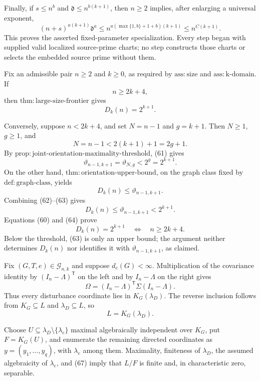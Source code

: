 Finally, if \(s\leq n^b\) and \(\mathfrak d\leq n^{b(k+1)}\), then \(n\geq2\) implies, after enlarging a universal exponent,
\[
 (n+s)^{a(k+1)}\mathfrak d^a
 \leq n^{a(\max\{1,b\}+1+b)(k+1)}
 \leq n^{C(k+1)}.
\tag{58}
\]
This proves the asserted fixed-parameter specialization.  Every step began with supplied valid localized source-prime charts; no step constructs those charts or selects the embedded source prime without them.

Fix an admissible pair \(n\geq2\) and \(k\geq0\), as required by \(\mathrm{ass:size}\) and \(\mathrm{ass:k\mbox{-}domain}\).  If
\[
 n\geq2k+4,
\tag{59}
\]
then \(\mathrm{thm:large\mbox{-}size\mbox{-}frontier}\) gives
\[
 D_k(n)=2^{k+1}.
\tag{60}
\]

Conversely, suppose \(n<2k+4\), and set \(N=n-1\) and \(g=k+1\).  Then \(N\geq1\), \(g\geq1\), and
\[
 N=n-1<2(k+1)+1=2g+1.
\tag{61}
\]
By \(\mathrm{prop:joint\mbox{-}orientation\mbox{-}maximality\mbox{-}threshold}\), (61) gives
\[
 \vartheta_{n-1,k+1}=\vartheta_{N,g}<2^g=2^{k+1}.
\tag{62}
\]
On the other hand, \(\mathrm{thm:orientation\mbox{-}upper\mbox{-}bound}\), on the graph class fixed by \(\mathrm{def:graph\mbox{-}class}\), yields
\[
 D_k(n)\leq\vartheta_{n-1,k+1}.
\tag{63}
\]
Combining (62)--(63) gives
\[
 D_k(n)\leq\vartheta_{n-1,k+1}<2^{k+1}.
\tag{64}
\]
Equations (60) and (64) prove
\[
 D_k(n)=2^{k+1}\quad\Longleftrightarrow\quad n\geq2k+4.
\tag{65}
\]
Below the threshold, (63) is only an upper bound; the argument neither determines \(D_k(n)\) nor identifies it with \(\vartheta_{n-1,k+1}\), as claimed.

Fix \((G,T,e)\in\mathcal G_{n,k}\) and suppose \(d_e(G)<\infty\).  Multiplication of the covariance identity by \((I_n-\Lambda)^{\mathsf T}\) on the left and by \(I_n-\Lambda\) on the right gives
\[
 \Omega=(I_n-\Lambda)^{\mathsf T}\Sigma(I_n-\Lambda).
\tag{66}
\]
Thus every disturbance coordinate lies in \(K_G(\lambda_D)\).  The reverse inclusion follows from \(K_G\subseteq L\) and \(\lambda_D\subseteq L\), so
\[
 L=K_G(\lambda_D).
\tag{67}
\]

Choose \(U\subseteq\lambda_D\setminus\{\lambda_e\}\) maximal algebraically independent over \(K_G\), put \(F=K_G(U)\), and enumerate the remaining directed coordinates as \(y=(y_1,\ldots,y_q)\), with \(\lambda_e\) among them.  Maximality, finiteness of \(\lambda_D\), the assumed algebraicity of \(\lambda_e\), and (67) imply that \(L/F\) is finite and, in characteristic zero, separable.

